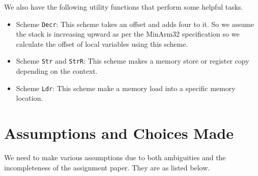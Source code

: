\documentclass{article}
\begin{document}
We also have the following utility functions that perform some helpful tasks.
\begin{itemize}
  \item Scheme \texttt{Decr}: This scheme takes an offset and adds four to it. So we assume the stack is increasing upward as per the MinArm32 specification so we calculate the offset of local variables using this scheme.
  \item Scheme \texttt{Str} and \texttt{StrR}: This scheme makes a memory store or register copy depending on the context.
  \item Scheme \texttt{Ldr}: This scheme make a memory load into a specific memory location.
\end{itemize}

\section{Assumptions and Choices Made}
We need to make various assumptions due to both ambiguities and the incompleteness of the assignment paper. They are as listed below.
\end{document}
